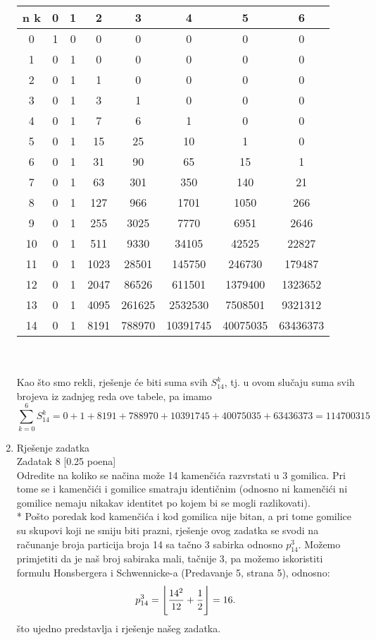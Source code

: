 \documentclass[12pt]{article}
\DeclarePairedDelimiter{\floor}{\lfloor}{\rfloor}
\begin{document}
\begin{enumerate}
\begin{tabular}{|c|c|c|c|c|c|c|c|}
\hline n k &  0&  1&  2&  3&  4& 5 & 6\\ 
\hline 0 &  1&  0&  0&  0&  0& 0&0\\
\hline 1 &  0&  1&  0&  0&  0& 0&0\\
\hline 2 &  0&  1& 1&  0&  0& 0&0\\ 
\hline 3 &  0&  1&  3&  1& 0 & 0&0\\
\hline 4 &  0&  1&  7&  6&  1& 0&0\\
\hline 5 &  0&  1&  15&  25&  10& 1&0\\
\hline 6 &  0&  1&  31&  90&  65& 15&1\\
\hline 7 &  0&  1&  63&  301&  350& 140&21\\
\hline 8 &  0&  1&  127&  966&  1701& 1050&266\\
\hline 9 &  0&  1&  255&  3025&  7770& 6951&2646\\
\hline 10&  0&  1&  511&  9330&  34105& 42525&22827\\
\hline 11&  0&  1&  1023&  28501&  145750& 246730&179487\\
\hline 12&  0&  1&  2047&  86526&  611501& 1379400&1323652\\
\hline 13&  0&  1&  4095&  261625&  2532530& 7508501&9321312\\
\hline 14&  0&  1&  8191&  788970&  10391745& 40075035&63436373\\
\hline
\end{tabular} \\
\\
Kao što smo rekli, rješenje će biti suma svih $S^k_{14}$, tj. u ovom slučaju suma
svih brojeva iz zadnjeg reda ove tabele, pa imamo
\begin{equation*}
   \sum_{k=0}^6 S^k_{14} = 0 + 1 + 8191 + 788970 +10391745 + 40075035 + 63436373 = 114700315
\end{equation*}	

		\item Rješenje zadatka \\
		Zadatak 8 [0.25 poena] \\
		
Odredite na koliko se načina može 14 kamenčića razvrstati u 3 gomilica. Pri
tome se i kamenčići i gomilice smatraju identičnim (odnosno ni kamenčići ni
gomilice nemaju nikakav identitet po kojem bi se mogli razlikovati). \\

* Pošto poredak kod kamenčića i kod gomilica nije bitan, a pri tome gomilice su skupovi
koji ne smiju biti prazni, rješenje ovog zadatka se svodi na računanje broja particija broja 14
sa tačno 3 sabirka odnosno $p^{3}_{14}$. Možemo primjetiti da je naš broj sabiraka mali, tačnije 3, 
pa možemo iskoristiti formulu Honsbergera i Schwennicke-a (Predavanje 5, strana 5), odnosno:
\begin{equation*}
p^3_{14} = \floor[\Bigg]{\frac{14^2}{12} + \frac{1}{2}} = 16.
\end{equation*}
što ujedno predstavlja i rješenje našeg zadatka.
		

\end{enumerate}
\end{document}
